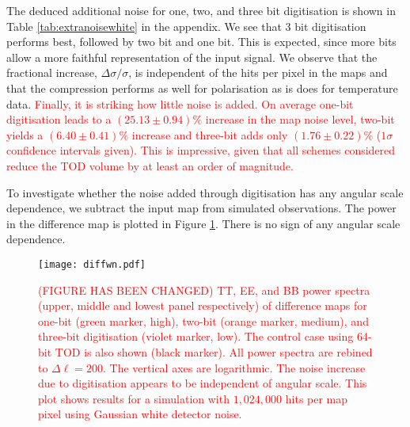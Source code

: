 \documentclass[apj]{emulateapj}
\newcommand{\changed}[1]{\textcolor{Red}{#1}}
\begin{document}


The deduced additional noise for one, two, and three bit digitisation is shown in Table \ref{tab:extranoisewhite} in the appendix. We see that 3 bit digitisation performs best, followed by two bit and one bit. This is expected, since more bits allow a more faithful representation of the input signal. We observe that the fractional increase, $\Delta \sigma / \sigma$, is independent of the hits per pixel in the maps and that the compression performs as well for polarisation as is does for temperature data. \changed{Finally, it is striking how little noise is added. On average one-bit digitisation leads to a $(25.13\pm 0.94)\%$ increase in the map noise level, two-bit yields a $(6.40\pm0.41)\%$ increase and three-bit adds only $(1.76\pm0.22)\%$ ($1\sigma$ confidence intervals given). This is impressive, given that all schemes considered reduce the TOD volume by at least an order of magnitude.}

To investigate whether the noise added through digitisation has any angular scale dependence, we subtract the input map from simulated observations. The power in the difference map is plotted in Figure \ref{fig:diffpswn}. There is no sign of any angular scale dependence.


\begin{figure}[htb]\centering
\texttt{[image: diffwn.pdf]}
  \caption[Current ]{
  \changed{(FIGURE HAS BEEN CHANGED) TT, EE, and BB power spectra (upper, middle and lowest panel respectively) of difference maps for one-bit (green marker, high), two-bit (orange marker, medium), and three-bit digitisation (violet marker, low). The control case using 64-bit TOD is also shown (black marker). All power spectra are rebined to $\Delta \ell = 200$. The vertical axes are logarithmic. The noise increase due to digitisation appears to be independent of angular scale. This plot shows results for a simulation with $1,024,000$ hits per map pixel using Gaussian white detector noise.}
\label{fig:diffpswn}
}
\end{figure}
\end{document}
